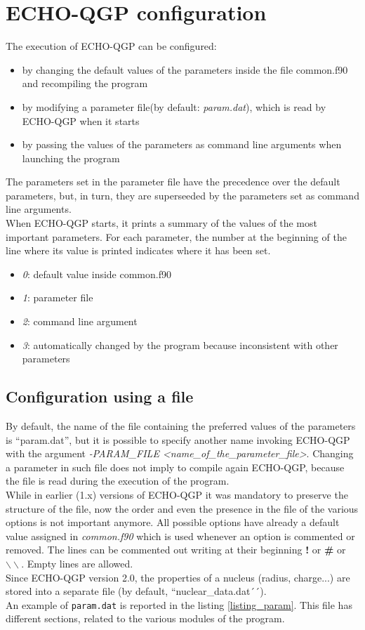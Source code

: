 \chapter{ECHO-QGP configuration}
The execution of ECHO-QGP can be configured:
\begin{itemize}
	\item by changing the default values of the parameters inside the file common.f90 and recompiling the program
	\item by modifying a parameter file(by default: \emph{param.dat}), which is read by ECHO-QGP when it starts
	\item by passing the values of the parameters as command line arguments when launching the program 
\end{itemize}
The parameters set in the parameter file have the precedence over the default parameters, but, in turn, they are superseeded by the parameters set as command line arguments.\\
When ECHO-QGP starts, it prints a summary of the values of the most important parameters. For each parameter, the number at the beginning of the line where its value is printed indicates where it has been set.\\
\begin{itemize}
	\item \emph{0}: default value inside common.f90
	\item \emph{1}: parameter file
	\item \emph{2}: command line argument
	\item \emph{3}: automatically changed by the program because inconsistent with other parameters
\end{itemize}

\section{Configuration using a file}
By default, the name of the file containing the preferred values of the parameters is ``param.dat'', but it is possible to specify another name invoking ECHO-QGP with the argument \emph{-PARAM\_FILE <name\_of\_the\_parameter\_file>}.
Changing a parameter in such file does not imply to compile again ECHO-QGP, because the file is read during the execution of the program.\\
While in earlier (1.x) versions of ECHO-QGP it was mandatory to preserve the structure of the file, now the order and even the presence in the file of the various options is not important anymore. All possible options have already a default value assigned in \emph{common.f90} which is used whenever an option is commented or removed. The lines can be commented out writing at their beginning \textbf{!} or \textbf{\#} or \textbf{$\backslash \backslash$}. Empty lines are allowed.\\
Since ECHO-QGP version 2.0, the properties of a nucleus (radius, charge...) are stored into a separate file (by default, ``nuclear\_data.dat´´).\\
An example of {\tt param.dat} is reported in the listing \ref{listing_param}. This file has different sections, related to the various modules of the program. 

